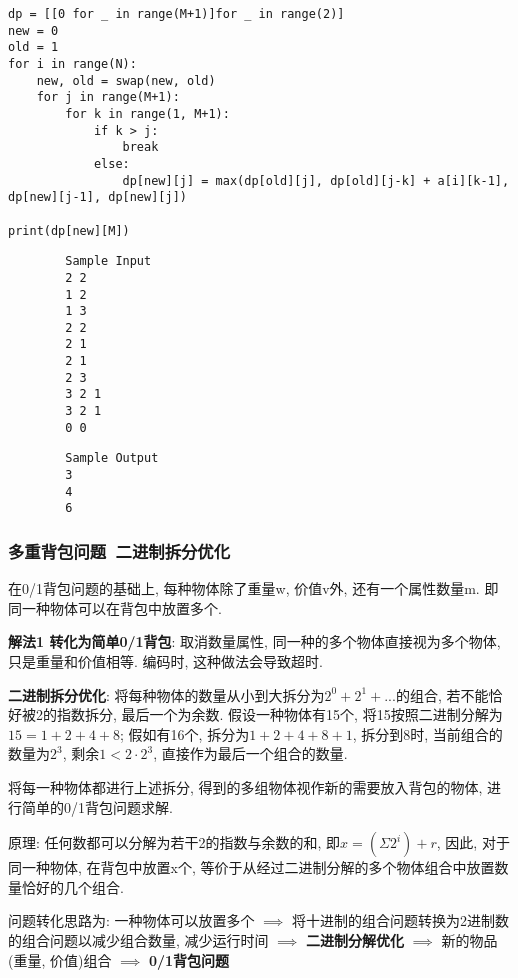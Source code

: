 \documentclass[../main]{subfiles}
\begin{document}
\begin{sloppy}
\begin{lstlisting}[style = Python]
dp = [[0 for _ in range(M+1)]for _ in range(2)]
new = 0
old = 1
for i in range(N):
    new, old = swap(new, old)
    for j in range(M+1):
        for k in range(1, M+1):
            if k > j:
                break
            else:
                dp[new][j] = max(dp[old][j], dp[old][j-k] + a[i][k-1], dp[new][j-1], dp[new][j])

print(dp[new][M])
\end{lstlisting}

\begin{center}
\begin{minipage}[t]{0.48\textwidth}
    \begin{verbatim}
        Sample Input
        2 2
        1 2
        1 3
        2 2
        2 1
        2 1
        2 3
        3 2 1
        3 2 1
        0 0
    \end{verbatim}
\end{minipage}
\begin{minipage}[t]{0.48\textwidth}
    \begin{verbatim}       
        Sample Output
        3
        4
        6
    \end{verbatim}
\end{minipage}
\end{center}

\newpage
\subsubsection{多重背包问题\ 二进制拆分优化}

在0/1背包问题的基础上, 每种物体除了重量w, 价值v外, 还有一个属性数量m. 即同一种物体可以在背包中放置多个.

\textbf{解法1 转化为简单0/1背包}: 取消数量属性, 同一种的多个物体直接视为多个物体, 只是重量和价值相等. 编码时, 这种做法会导致超时.

\textbf{二进制拆分优化}: 将每种物体的数量从小到大拆分为$2^0+2^1+...$的组合, 若不能恰好被2的指数拆分, 最后一个为余数. 假设一种物体有15个, 将15按照二进制分解为$15=1+2+4+8$; 假如有16个, 拆分为$1+2+4+8+1$, 拆分到8时, 当前组合的数量为$2^3$, 剩余$1<2 \cdot 2^3$, 直接作为最后一个组合的数量.

将每一种物体都进行上述拆分, 得到的多组物体视作新的需要放入背包的物体, 进行简单的0/1背包问题求解.

原理: 任何数都可以分解为若干2的指数与余数的和, 即$x = (\Sigma{2^i}) + r$, 因此, 对于同一种物体, 在背包中放置x个, 等价于从经过二进制分解的多个物体组合中放置数量恰好的几个组合. 

问题转化思路为: 一种物体可以放置多个 $\implies$ 将十进制的组合问题转换为2进制数的组合问题以减少组合数量, 减少运行时间 $\implies$ \textbf{二进制分解优化} $\implies$ 新的物品(重量, 价值)组合 $\implies$ \textbf{0/1背包问题}


\end{sloppy}
\end{document}
